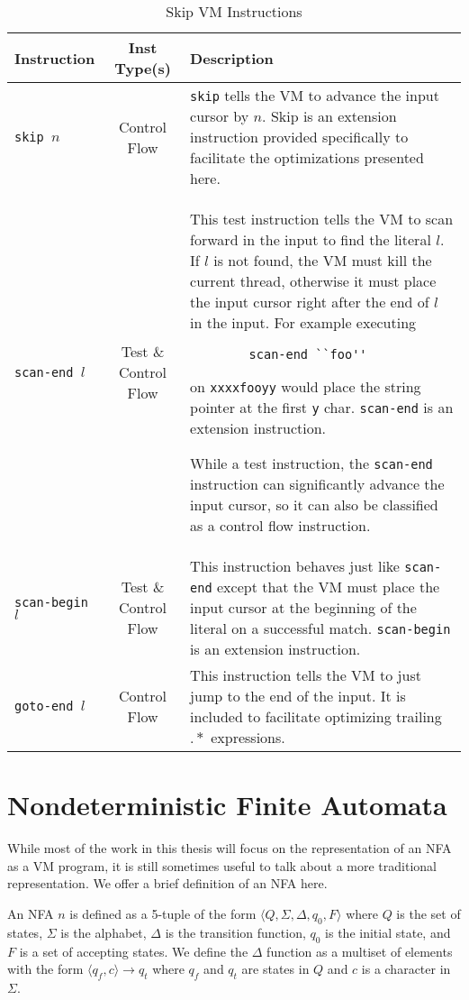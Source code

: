 \begin{table}[ht]
\caption{Skip VM Instructions}
\label{table:skipinsts}
\centering

\begin{tabular}{ | l | c | p{8cm} | } \hline
Instruction & Inst Type(s) & Description \\ \hline
{\tt skip $n$} & Control Flow &
    \verb'skip' tells the VM to advance the input cursor by $n$.
    Skip is an extension
    instruction provided specifically to facilitate the optimizations
    presented here. \\ \hline
{\tt scan-end $l$} & Test \& Control Flow &
    This test instruction tells the VM to scan forward in the input to find
    the literal $l$. If $l$ is not found, the VM must kill the current thread,
    otherwise it must place the input cursor
    right after the end of $l$ in the input. For example executing
        \begin{verbatim}
        scan-end ``foo''
        \end{verbatim}
    on \verb'xxxxfooyy' would place the string pointer at the first \verb'y'
    char. \verb'scan-end' is an extension instruction.

    While a test instruction, the \verb'scan-end' instruction can
    significantly advance the input cursor, so it can also be classified
    as a control flow instruction. \\ \hline
{\tt scan-begin $l$} & Test \& Control Flow &
    This instruction behaves just like \verb'scan-end' except that the
    VM must place the input cursor at the beginning of the literal on
    a successful match. \verb'scan-begin' is an extension instruction.
    \\ \hline
{\tt goto-end $l$} & Control Flow &
    This instruction tells the VM to just jump to the end of the input.
    It is included to facilitate optimizing trailing $.*$ expressions.
    \\ \hline
\end{tabular}

\end{table}

\section{Nondeterministic Finite Automata}
\label{section:nfadef}

While most of the work in this thesis will focus on the representation
of an NFA as a VM program, it is still sometimes useful to talk about
a more traditional representation. We offer
a brief definition of an NFA here.

An NFA $n$ is defined as a 5-tuple of the form
$\langle Q, \Sigma, \Delta, q_0, F \rangle$ where $Q$ is the
set of states, $\Sigma$ is the alphabet, $\Delta$ is the transition
function, $q_0$ is the initial state, and $F$ is a set of accepting
states. We define the $\Delta$ function as a multiset of elements
with the form $\langle q_f, c \rangle \rightarrow q_t$ where
$q_f$ and $q_t$ are states in $Q$ and $c$ is a character in $\Sigma$.


